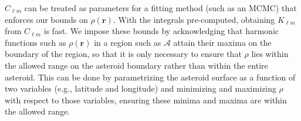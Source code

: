 \documentclass[9pt,twocolumn]{article}
\numberwithin{equation}{section}
\begin{document}
$C_{\ell m}$ can be treated as parameters for a fitting method (such as an MCMC) that enforces our bounds on $\rho(\bm r)$. With the integrals pre-computed, obtaining $K_{\ell m}$ from $C_{\ell m}$ is fast. We impose these bounds by acknowledging that harmonic functions such as $\rho(\bm r)$ in a region such as $\mathcal{A}$ attain their maxima on the boundary of the region, so that it is only necessary to ensure that $\rho$ lies within the allowed range on the asteroid boundary rather than within the entire asteroid. This can be done by parametrizing the asteroid surface as a function of two variables (e.g., latitude and longitude) and minimizing and maximizing $\rho$ with respect to those variables, ensuring these minima and maxima are within the allowed range.

\end{document}
